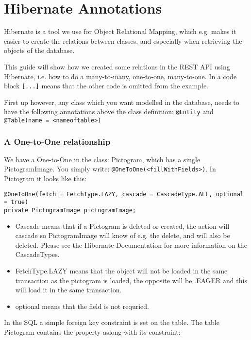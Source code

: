 \newpage
\section{Hibernate Annotations}

Hibernate is a tool we use for Object Relational Mapping, which e.g. makes it easier to create the relations between classes, and especially when retrieving the objects of the database.

This guide will show how we created some relations in the REST API using Hibernate, i.e. how to do a many-to-many, one-to-one, many-to-one.
In a code block \texttt{[...]} means that the other code is omitted from the example.

First up however, any class which you want modelled in the database, needs to have the following annotations above the class definition: \texttt{@Entity} and \texttt{@Table(name = <nameoftable>)}

\subsubsection*{A One-to-One relationship}

We have a One-to-One in the class: Pictogram, which has a single PictogramImage.
You simply write:  \texttt{@OneToOne(<fillWithFields>)}.
In Pictogram it looks like this:
    
\begin{lstlisting}[caption={A One-to-One relationship using \texttt{PictogramImage}, on \texttt{Pictogram}.}] 
@OneToOne(fetch = FetchType.LAZY, cascade = CascadeType.ALL, optional = true)
private PictogramImage pictogramImage;
\end{lstlisting}


\begin{itemize}
\item Cascade means that if a Pictogram is deleted or created, the action will cascade so PictogramImage will know of e.g. the delete, and will also be deleted. Please see the Hibernate Documentation for more information on the CascadeTypes.
\item FetchType.LAZY means that the object will not be loaded in the same transaction as the pictogram is loaded, the opposite will be .EAGER and this will load it in the same transaction.
\item optional means that the field is not requried.
\end{itemize}

In the SQL a simple foreign key constraint is set on the table. The table Pictogram contains the property aslong with its constraint:


